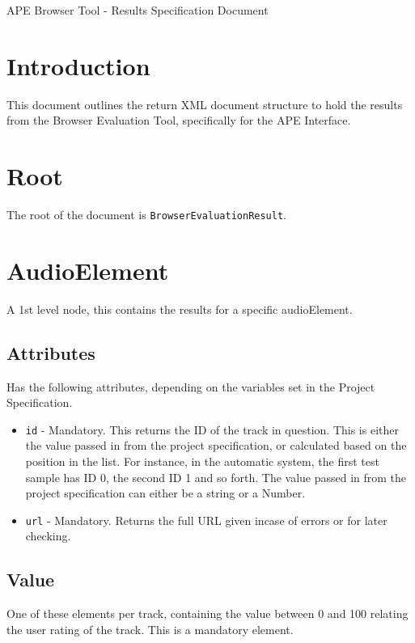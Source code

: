 \documentclass{article}
\begin{document}
\large APE Browser Tool - Results Specification Document

\section{Introduction}
This document outlines the return XML document structure to hold the results from the Browser Evaluation Tool, specifically for the APE Interface.

\section{Root}
The root of the document is \texttt{BrowserEvaluationResult}.

\section{AudioElement}
A 1st level node, this contains the results for a specific audioElement.

\subsection{Attributes}
Has the following attributes, depending on the variables set in the Project Specification.
\begin{itemize}
\item \texttt{id} - Mandatory. This returns the ID of the track in question. This is either the value passed in from the project specification, or calculated based on the position in the list. For instance, in the automatic system, the first test sample has ID 0, the second ID 1 and so forth. The value passed in from the project specification can either be a string or a Number.
\item \texttt{url} - Mandatory. Returns the full URL given incase of errors or for later checking.
\end{itemize}

\subsection{Value}
One of these elements per track, containing the value between 0 and 100 relating the user rating of the track. This is a mandatory element.
\end{document}
